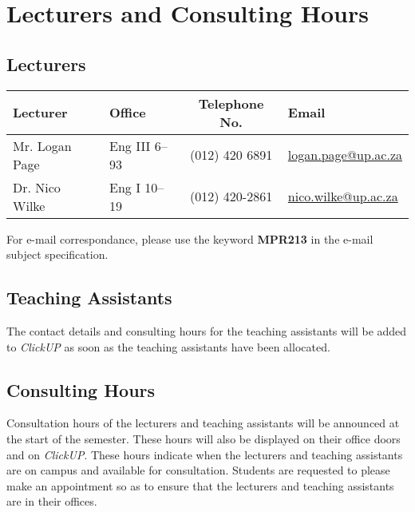 \section{Lecturers and Consulting Hours}
    \subsection{Lecturers}
        \begin{table}[!h]
            \begin{center}
             \begin{tabular}{|l|l|c|l|}
                 \hline
                 {\bf Lecturer} & {\bf Office} & {\bf Telephone No.} & {\bf Email} \\
                 \hline
                 Mr. Logan Page &
                 Eng III 6--93 &
                 (012) 420 6891 &
                 \href{mailto:logan.page@up.ac.za}{logan.page@up.ac.za} \\
                 Dr. Nico Wilke &
                 Eng I 10--19 &
                 (012) 420-2861 &
                 \href{mailto:nico.wilke@up.ac.za}{nico.wilke@up.ac.za} \\
                 \hline
             \end{tabular}
            \end{center}
        \end{table}

        For e-mail correspondance, please use the keyword
        \textbf{MPR213} in the e-mail subject specification.

    \subsection{Teaching Assistants}
        The contact details and consulting hours for the teaching assistants
        will be added to {\it ClickUP} as soon as the teaching assistants have been
        allocated.

    \subsection{Consulting Hours}
        Consultation hours of the lecturers and teaching assistants will be
        announced at the start of the semester. These hours will also be
        displayed on their office doors and on {\it ClickUP}. These hours indicate
        when the lecturers and teaching assistants are on campus and available
        for consultation. Students are requested to please make an appointment
        so as to ensure that the lecturers and teaching assistants are in their
        offices.

